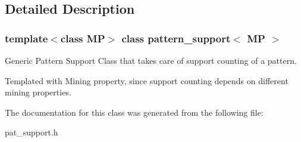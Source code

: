 \subsection{Detailed Description}
\subsubsection*{template$<$class MP$>$ class pattern\_\-support$<$ MP $>$}

Generic Pattern Support Class that takes care of support counting of a pattern. 

Templated with Mining property, since support counting depends on different mining properties. 



The documentation for this class was generated from the following file:\begin{CompactItemize}
\item 
pat\_\-support.h\end{CompactItemize}
